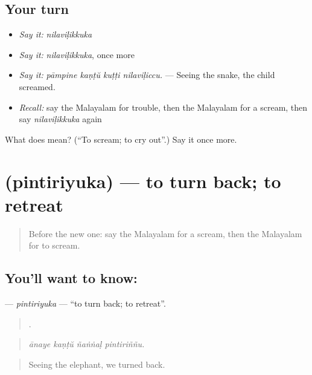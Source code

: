 \subsection*{Your turn}
\begin{itemize}
\raggedright
  \item \emph{Say it:} \emph{nilaviḷikkuka}
  \item \emph{Say it:} \emph{nilaviḷikkuka}, once more
  \item \emph{Say it:} \emph{pāmpine kaṇṭŭ kuṭṭi nilaviḷiccu.} — Seeing the snake, the child screamed.
  \item \emph{Recall:} say the Malayalam for trouble, then the Malayalam for a scream, then say \emph{nilaviḷikkuka} again
\end{itemize}

\begin{tcolorbox}[breakable,colback=teal!4,colframe=teal!35!black,title={Before you move on}]
What does  mean? (\textquotedblleft{}To scream; to cry out\textquotedblright{}.) Say it once more.
\end{tcolorbox}
\section[\texorpdfstring{\ml{പിന്തിരിയുക} (pintiriyuka)}{പിന്തിരിയുക (pintiriyuka)}]{ (pintiriyuka) — to turn back; to retreat}

\label{lesson:ML-C380-pintiriyuka}



\begin{quote}
Before the new one: say the Malayalam for a scream, then the Malayalam for to scream.
\end{quote}

\subsection*{You'll want to know: }
\textbf{} — \emph{pintiriyuka} — \textquotedblleft{}to turn back; to retreat\textquotedblright{}.

\begin{quote}
   .
\end{quote}

\begin{quote}
\emph{ānaye kaṇṭŭ ñaṅṅaḷ pintiriññu.}
\end{quote}

\begin{quote}
Seeing the elephant, we turned back.
\end{quote}

